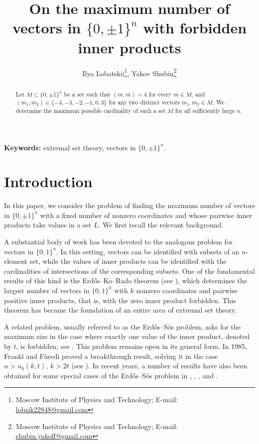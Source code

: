 \documentclass[12pt,a4paper]{article}
\title{On the maximum number of vectors in $\{0,\pm1\}^n$ with forbidden inner products}
\author{Ilya Lobatskii\thanks{Moscow Institute of Physics and Technology; E-mail: \url{ lobzik22848@gmail.com}}, Yakov Shubin\thanks{Moscow Institute of Physics and Technology;
E-mail: \url{shubin.yakoff@gmail.com}}}
\begin{document}
\maketitle
\nocite{*}

\newenvironment{Proof}
{\par\noindent{\bf Proof.}}
{\hfill$\scriptstyle\blacksquare$}


\begin{abstract}
    Let $M \subset \{0,\pm1\}^n$ be a set such that $(m,m)=4$ for every $m\in M$, and $(m_1,m_2)\in\{-4,-3,-2,-1,0,3\}$ for any two distinct vectors $m_1,m_2\in M$. We determine the maximum possible cardinality of such a set $M$ for all sufficiently large $n$.
\end{abstract}

\textbf{Keywords:} extremal set theory, vectors in $\{0,\pm1\}^n$.


\section{Introduction}

In this paper, we consider the problem of finding the maximum number of vectors in $\{0,\pm 1\}^n$ with a fixed number of nonzero coordinates and whose pairwise inner products take values in a set $L$. We first recall the relevant background.

A substantial body of work has been devoted to the analogous problem for vectors in $\{0,1\}^n$. In this setting, vectors can be identified with subsets of an $n$-element set, while the values of inner products can be identified with the cardinalities of intersections of the corresponding subsets. One of the fundamental results of this kind is the Erd\H{o}s--Ko--Rado theorem (see \cite{EKR}), which determines the largest number of vectors in $\{0,1\}^n$ with $k$ nonzero coordinates and pairwise positive inner products, that is, with the zero inner product forbidden. This theorem has became the foundation of an entire area of extremal set theory.

A related problem, usually referred to as the Erd\H{o}s--S\'os problem, asks for the maximum size in the case where exactly one value of the inner product, denoted by $t$, is forbidden; see \cite{ES}. This problem remains open in its general form. In 1985, Frankl and F\"uredi proved a breakthrough result, solving it in the case $n > n_0(k,t)$, $k > 2t$ (see \cite{FF}). In recent years, a number of results have also been obtained for some special cases of the Erd\H{o}s--S\'os problem in \cite{Linz}, \cite{KZ}, \cite{EKL}, and \cite{los}.
\end{document}
